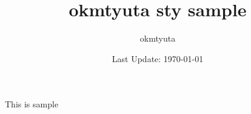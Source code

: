 \documentclass[10.5pt, a4, dvipdfmx]{jarticle}
\title{okmtyuta sty sample}
\author{okmtyuta}
\date{Last Update: \today}
\begin{document}
  \maketitle
  \thispagestyle{empty}

  This is sample
  
\end{document}
